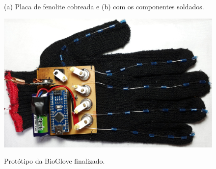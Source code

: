 \documentclass[
	12pt,				%
	openright,			%
	oneside,			%
	a4paper,			%
	english,			%
	brazil				%
	]{abntex2}
\begin{document}
	
	\begin{figure}[!htb]
		 \centering
		 \caption{(a) Placa de fenolite cobreada e (b) com os componentes soldados.} 
		 \centering
		 \label{Fig:phenolic-and-ready}
	\end{figure}

	

		\begin{figure}[h!]
			\centering
			\caption{Protótipo da BioGlove finalizado.}
  		\includegraphics[width=14cm,keepaspectratio=true]{figures/glove-ready1.jpg}
  		\label{Fig:glove-ready1}
		\end{figure}
\end{document}
